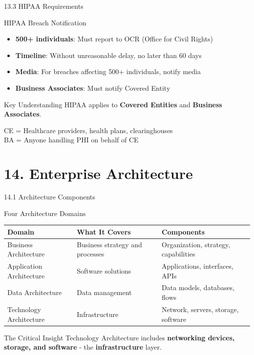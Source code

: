 \documentclass{beamer}
\begin{document}
	\begin{frame}{13.3 HIPAA Requirements}
		\begin{block}{HIPAA Breach Notification}
			\begin{itemize}
				\item \textbf{500+ individuals}: Must report to OCR (Office for Civil Rights)
				\item \textbf{Timeline}: Without unreasonable delay, no later than 60 days
				\item \textbf{Media}: For breaches affecting 500+ individuals, notify media
				\item \textbf{Business Associates}: Must notify Covered Entity
			\end{itemize}
		\end{block}
		
		\begin{exampleblock}{Key Understanding}
			HIPAA applies to \textbf{Covered Entities} and \textbf{Business Associates}.
			
			CE = Healthcare providers, health plans, clearinghouses \\
			BA = Anyone handling PHI on behalf of CE
		\end{exampleblock}
	\end{frame}
	
	\section{14. Enterprise Architecture}
	
	\begin{frame}{14.1 Architecture Components}
		\begin{block}{Four Architecture Domains}
			\begin{tabular}{|p{2.5cm}|p{4cm}|p{4.5cm}|}
				\hline
				\textbf{Domain} & \textbf{What It Covers} & \textbf{Components} \\
				\hline
				Business Architecture & Business strategy and processes & Organization, strategy, capabilities \\
				\hline
				Application Architecture & Software solutions & Applications, interfaces, APIs \\
				\hline
				Data Architecture & Data management & Data models, databases, flows \\
				\hline
				Technology Architecture & Infrastructure & Network, servers, storage, software \\
				\hline
			\end{tabular}
		\end{block}
		
		\begin{alertblock}{The Critical Insight}
			Technology Architecture includes \textbf{networking devices, storage, and software} - the \textbf{infrastructure} layer.
		\end{alertblock}
	\end{frame}
	
\end{document}
